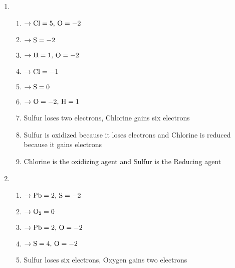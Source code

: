\documentclass[12pt]{article}
\begin{document}
\begin{enumerate}
\begin{enumerate}
      \item {}

        \begin{enumerate}

          \item {} $\rightarrow \ce{Cl}=5,\,\ce{O}=-2$

          \item {} $\rightarrow \ce{S}=-2$

          \item {} $\rightarrow \ce{H}=1,\,\ce{O}=-2$

          \item {} $\rightarrow \ce{Cl}=-1$

          \item {} $\rightarrow \ce{S}=0$

          \item {} $\rightarrow \ce{O}=-2,\,\ce{H}=1$

          \item Sulfur loses two electrons, Chlorine gains six electrons

          \item Sulfur is oxidized because it loses electrons and Chlorine is reduced because it gains electrons

          \item Chlorine is the oxidizing agent and Sulfur is the Reducing agent

        \end{enumerate}

      \item {}

        \begin{enumerate}

          \item {} $\rightarrow \ce{Pb}=2,\,\ce{S}=-2$

          \item {} $\rightarrow \ce{O2}=0$

          \item {} $\rightarrow \ce{Pb}=2,\,\ce{O}=-2$

          \item {} $\rightarrow \ce{S}=4,\,\ce{O}=-2$

          \item Sulfur loses six electrons, Oxygen gains two electrons


\end{enumerate}
\end{enumerate}
\end{enumerate}
\end{document}
